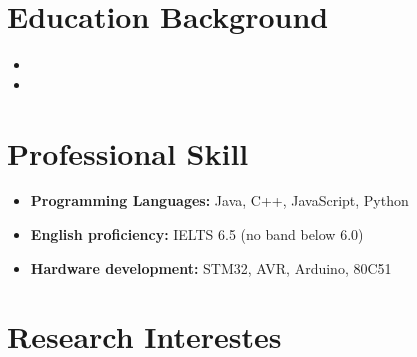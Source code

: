 \documentclass[11pt,a4paper,sans]{moderncv}
\begin{document}
\makecvtitle


\section{Education Background}
\vspace{5pt}
\begin{itemize}
\item{}
\item{}
\end{itemize}

\section{Professional Skill}

\begin{itemize}
\item \textbf{Programming Languages: } Java, C++, JavaScript, Python
\vspace{1pt}

\item \textbf{English proficiency: } IELTS 6.5 (no band below 6.0)
\vspace{1pt}

\item \textbf{Hardware development:} STM32, AVR, Arduino, 80C51
\end{itemize}

\section{Research Interestes}
\end{document}
